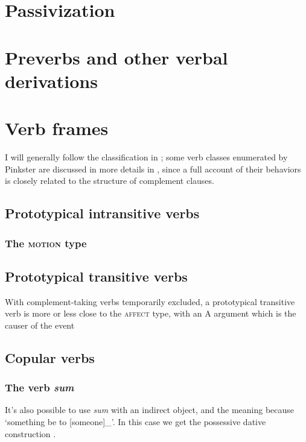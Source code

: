 \documentclass[a4paper, oneside]{report}
\newcommand*{\citesec}[1]{\S~{#1}}
\newcommand*{\citechap}[1]{chap.~{#1}}
\newcommand{\form}[1]{\emph{#1}}
\newcommand{\translate}[1]{`#1'}
\newcommand{\classify}[1]{{\textsc{#1}}}
\begin{document}
\section{Passivization}\label{sec:passive}

\section{Preverbs and other verbal derivations}

\section{Verb frames}

I will generally follow the classification in \citet[\citechap{4}]{Pinkster1};
some verb classes enumerated by Pinkster are discussed in more details 
in ,
since a full account of their behaviors is closely related to the structure of complement clauses.

\subsection{Prototypical intransitive verbs}\label{sec:prototypical-intransitive}

\subsubsection{The \classify{motion} type}


\subsection{Prototypical transitive verbs}\label{sec:prototypical-transitive}

With complement-taking verbs temporarily excluded,
a prototypical transitive verb is more or less close to the \classify{affect} type,
with an A argument which is the causer of the event 

\subsection{Copular verbs}

\subsubsection{The verb \form{sum}}\label{sec:sum}

It's also possible to use \form{sum} with an indirect object, 
and the meaning because \translate{something be to [someone]_{}}.
In this case we get the possessive dative construction
\citep[\citesec{373}]{allen1903allen}.
\end{document}
